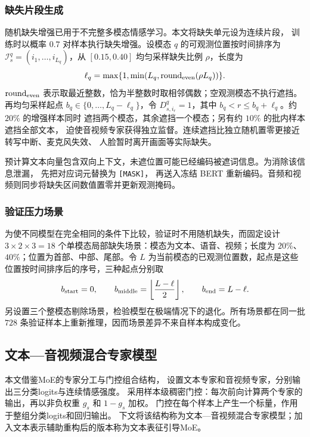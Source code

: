 \documentclass[bwprint]{gmcmthesis}
\begin{document}
\subsubsection{缺失片段生成}

随机缺失增强已用于不完整多模态情感学习\citep{wang2025distill}。本文将缺失单元设为连续片段，
训练时以概率 $0.7$ 对样本执行缺失增强。设模态 $q$ 的可观测位置按时间排序为
$\mathcal I_s^q=(i_1,\ldots,i_{L_q})$，从 $[0.15,0.40]$ 均匀采样缺失比例
$\rho$，长度为
\begin{equation}
 \ell_q=\max\{1,\min(L_q,\operatorname{round}_{\rm even}(\rho L_q))\}.
 \label{eq:p2-drop-length}
\end{equation}
$\operatorname{round}_{\rm even}$ 表示取最近整数，恰为半整数时取相邻偶数；空观测模态不执行遮挡。再均匀采样起点 $b_q\in\{0,\ldots,L_q-\ell_q\}$，令
$D^q_{s,i_r}=1$，其中 $b_q<r\le b_q+\ell_q$。约 $20\%$ 的增强样本同时
遮挡两个模态，其余遮挡一个模态；另有约 $10\%$ 的批内样本遮挡全部文本，
迫使音视频专家获得独立监督。连续遮挡比独立随机置零更接近转写中断、麦克风失效、
人脸暂时离开画面等实际缺失。

预计算文本向量包含双向上下文，未遮位置可能已经编码被遮词信息。为消除该信息泄漏，
先把对应词元替换为 \texttt{[MASK]}，
再送入冻结 BERT 重新编码。音频和视频则同步将缺失区间数值置零并更新观测掩码。

\subsubsection{验证压力场景}

为使不同模型在完全相同的条件下比较，验证时不用随机缺失，而固定设计
$3\times2\times3=18$ 个单模态局部缺失场景：模态为文本、语音、视频；长度为
$20\%$、$40\%$；位置为首部、中部、尾部。令 $L$ 为当前模态的已观测位置数，起点是这些位置按时间排序后的序号，三种起点分别取
\begin{equation}
 b_{\rm start}=0,\qquad b_{\rm middle}=\left\lfloor\frac{L-\ell}{2}\right\rfloor,
 \qquad b_{\rm end}=L-\ell.
 \label{eq:p2-fixed-position}
\end{equation}
另设置三个整模态剔除场景，检验模型在极端情况下的退化。所有场景都在同一批
$728$ 条验证样本上重新推理，因而场景差异不来自样本构成变化。

\subsection{文本—音视频混合专家模型}

本文借鉴MoE的专家分工与门控组合结构\citep{jacobs1991moe}，
设置文本专家和音视频专家，分别输出三分类logits与连续情感强度。
采用样本级稠密门控：每次前向计算两个专家的输出，再以非负权重 $g_s$ 和 $1-g_s$ 加权。
门控在每个样本上产生一个标量，作用于整组分类logits和回归输出。
下文将该结构称为文本—音视频混合专家模型；加入文本表示辅助重构后的版本称为文本表征引导MoE。
\end{document}
